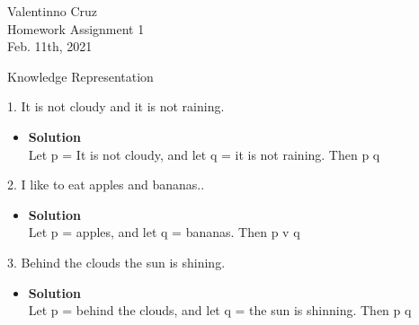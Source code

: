 \documentclass[11pt]{article}
\begin{document}
\begin{center}
    {\Large Valentinno Cruz\\
    Homework Assignment 1\\
    Feb. 11th, 2021\\}

\end{center}


\begin{flushleft}
{\Large Knowledge Representation}
\end{flushleft}




\begin{flushleft}
{\large 1. It is not cloudy and it is not raining.}
\end{flushleft}



\begin{itemize}

\item \textbf{Solution}\\
Let p = It is not cloudy, and let q = it is not raining.
Then p \land  q\\

\end{itemize}






\begin{flushleft}
{\large 2. I like to eat apples and bananas..}
\end{flushleft}



\begin{itemize}

\item \textbf{Solution}\\
Let p = apples, and let q = bananas. 
Then p v q \\



\end{itemize}






\begin{flushleft}
{\large 3. Behind the clouds the sun is shining.}
\end{flushleft}



\begin{itemize}

\item \textbf{Solution}\\
Let p = behind the clouds, and let q = the sun is shinning. 
Then p \land  q \\



\end{itemize}
\end{document}
